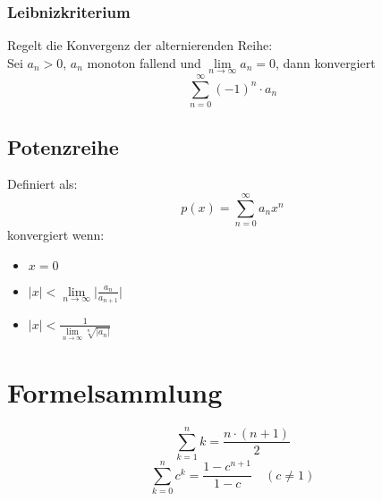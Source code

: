 \documentclass[12pt,a4paper]{article}
\begin{document}
\subsubsection{Leibnizkriterium}
Regelt die Konvergenz der alternierenden Reihe:\\
Sei $a_n>0$, $a_n$ monoton fallend und $\lim\limits_{n\rightarrow\infty}a_n=0$, dann konvergiert
\[\sum_{n=0}^{\infty}(-1)^{n}\cdot a_n\]

\subsection{Potenzreihe}
Definiert als:
\[p(x)=\sum_{n=0}^{\infty}a_nx^n\]
konvergiert wenn:
\begin{itemize}
	\item $x=0$
	\item $\lvert x\rvert<\lim\limits_{n\rightarrow\infty}\lvert\frac{a_n}{a_{n+1}}\rvert$
	\item $\lvert x\rvert<\frac{1}{\lim\limits_{n\rightarrow\infty}\sqrt[n]{\lvert a_n \rvert}}$
\end{itemize}

\pagebreak

\section{Formelsammlung}
\[\sum_{k=1}^nk=\frac{n\cdot(n+1)}{2}\]
\[\sum_{k=0}^nc^k=\frac{1-c^{n+1}}{1-c}\quad(c\neq 1)\]
\end{document}
